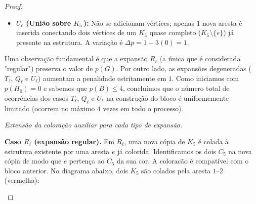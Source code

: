 \documentclass[reqno, 12pt]{amsart}
\numberwithin{equation}{section}
\theoremstyle{plain}
\theoremstyle{definition}
\begin{document}
\begin{proof}
\begin{itemize}
  \item \textbf{$U_\ell$ (União sobre $K_5^-$):} Não se adicionam vértices; apenas $1$ nova aresta é 
    inserida conectando dois vértices de um $K_5$ quase completo ($K_5 \setminus \{e\}$) já 
    presente na estrutura. 
    A variação é $\Delta p = 1 - 3(0) = 1$.
\end{itemize}

Uma observação fundamental é que a expansão \textbf{$R_\ell$} (a única que é considerada "regular") 
preserva o valor de $p(G)$. Por outro lado, as expansões degeneradas (\textbf{$T_\ell$}, \textbf{$Q_\ell$} e \textbf{$U_\ell$}) 
aumentam a penalidade estritamente em $1$. Como iniciamos com $p(H_0) = 0$ e sabemos que $p(B) \le 4$, concluímos 
que o número total de ocorrências dos casos $T_\ell$, $Q_\ell$ e $U_\ell$ na construção do bloco é uniformemente 
limitado (ocorrem no máximo $4$ vezes em todo o processo).

\medskip
\noindent\textit{Extensão da coloração auxiliar para cada tipo de expansão.}
\medskip

\noindent\textbf{Caso $R_\ell$ (expansão regular).}
Em $R_\ell$, uma nova cópia de $K_5$ é colada à estrutura existente por uma aresta $e$ já colorida.
Identificamos os dois $C_5$ na nova cópia de modo que $e$ pertença ao $C_5$ da sua cor.
A coloracão é compatível com o bloco anterior.
No diagrama abaixo, dois $K_5$ são colados pela aresta $1$--$2$ (vermelha):

\medskip
\begin{center}
\end{center}


\end{proof}
\end{document}
